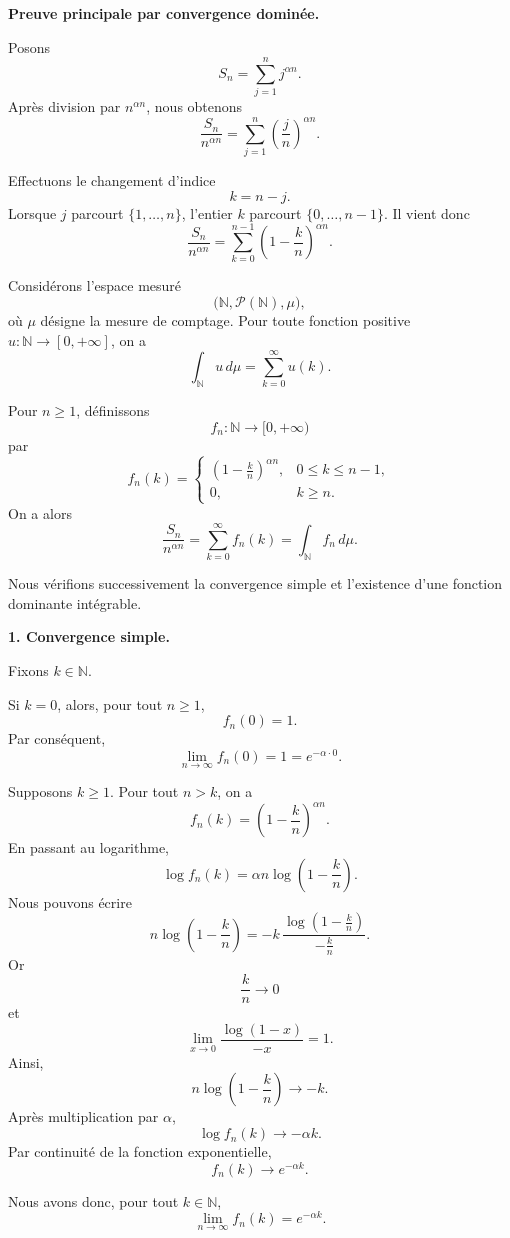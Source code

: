 \documentclass[11pt,a4paper]{article}
\newcommand{\N}{\mathbb{N}}
\newcommand{\1}{\mathbf{1}}
\begin{document}
\begin{preuvebox}
\textbf{Preuve principale par convergence domin\'ee.}

Posons
\[
S_n=\sum_{j=1}^{n}j^{\alpha n}.
\]
Apr\`es division par \(n^{\alpha n}\), nous obtenons
\[
\frac{S_n}{n^{\alpha n}}
=
\sum_{j=1}^{n}
\left(\frac{j}{n}\right)^{\alpha n}.
\]

Effectuons le changement d'indice
\[
k=n-j.
\]
Lorsque \(j\) parcourt \(\{1,\ldots,n\}\), l'entier \(k\)
parcourt \(\{0,\ldots,n-1\}\). Il vient donc
\[
\frac{S_n}{n^{\alpha n}}
=
\sum_{k=0}^{n-1}
\left(1-\frac{k}{n}\right)^{\alpha n}.
\]

Consid\'erons l'espace mesur\'e
\[
\bigl(\N,\mathcal{P}(\N),\mu\bigr),
\]
o\`u \(\mu\) d\'esigne la mesure de comptage. Pour toute fonction
positive \(u:\N\to[0,+\infty]\), on a
\[
\int_{\N}u\,d\mu
=
\sum_{k=0}^{\infty}u(k).
\]

Pour \(n\geq1\), d\'efinissons
\[
f_n:\N\longrightarrow[0,+\infty)
\]
par
\[
f_n(k)
=
\begin{cases}
\displaystyle
\left(1-\frac{k}{n}\right)^{\alpha n},
& 0\leq k\leq n-1,\\[1.2ex]
0,
& k\geq n.
\end{cases}
\]
On a alors
\[
\frac{S_n}{n^{\alpha n}}
=
\sum_{k=0}^{\infty}f_n(k)
=
\int_{\N}f_n\,d\mu.
\]

Nous v\'erifions successivement la convergence simple et
l'existence d'une fonction dominante int\'egrable.

\medskip

\textbf{1. Convergence simple.}

Fixons \(k\in\N\).

Si \(k=0\), alors, pour tout \(n\geq1\),
\[
f_n(0)=1.
\]
Par cons\'equent,
\[
\lim_{n\to\infty}f_n(0)=1=e^{-\alpha\cdot0}.
\]

Supposons \(k\geq1\). Pour tout \(n>k\), on a
\[
f_n(k)
=
\left(1-\frac{k}{n}\right)^{\alpha n}.
\]
En passant au logarithme,
\[
\log f_n(k)
=
\alpha n
\log\left(1-\frac{k}{n}\right).
\]
Nous pouvons \'ecrire
\[
n\log\left(1-\frac{k}{n}\right)
=
-k\,
\frac{
  \log\left(1-\frac{k}{n}\right)
}{
  -\frac{k}{n}
}.
\]
Or
\[
\frac{k}{n}\longrightarrow0
\]
et
\[
\lim_{x\to0}
\frac{\log(1-x)}{-x}
=
1.
\]
Ainsi,
\[
n\log\left(1-\frac{k}{n}\right)
\longrightarrow -k.
\]
Apr\`es multiplication par \(\alpha\),
\[
\log f_n(k)\longrightarrow-\alpha k.
\]
Par continuit\'e de la fonction exponentielle,
\[
f_n(k)\longrightarrow e^{-\alpha k}.
\]

Nous avons donc, pour tout \(k\in\N\),
\[
\lim_{n\to\infty}f_n(k)=e^{-\alpha k}.
\]


\end{preuvebox}
\end{document}
